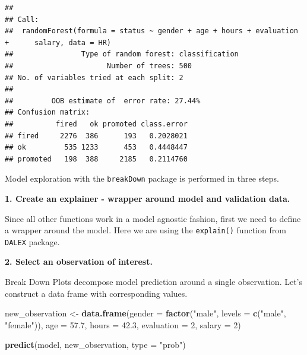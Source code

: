 \documentclass[]{krantz}
\newenvironment{Shaded}{\begin{snugshade}}{\end{snugshade}}
\newcommand{\ControlFlowTok}[1]{\textcolor[rgb]{0.13,0.29,0.53}{\textbf{#1}}}
\newcommand{\DataTypeTok}[1]{\textcolor[rgb]{0.13,0.29,0.53}{#1}}
\newcommand{\DecValTok}[1]{\textcolor[rgb]{0.00,0.00,0.81}{#1}}
\newcommand{\FloatTok}[1]{\textcolor[rgb]{0.00,0.00,0.81}{#1}}
\newcommand{\KeywordTok}[1]{\textcolor[rgb]{0.13,0.29,0.53}{\textbf{#1}}}
\newcommand{\NormalTok}[1]{#1}
\newcommand{\OperatorTok}[1]{\textcolor[rgb]{0.81,0.36,0.00}{\textbf{#1}}}
\newcommand{\StringTok}[1]{\textcolor[rgb]{0.31,0.60,0.02}{#1}}
\theoremstyle{definition}
\theoremstyle{definition}
\theoremstyle{definition}
\theoremstyle{remark}
\begin{document}
\begin{verbatim}
## 
## Call:
##  randomForest(formula = status ~ gender + age + hours + evaluation +      salary, data = HR) 
##                Type of random forest: classification
##                      Number of trees: 500
## No. of variables tried at each split: 2
## 
##         OOB estimate of  error rate: 27.44%
## Confusion matrix:
##          fired   ok promoted class.error
## fired     2276  386      193   0.2028021
## ok         535 1233      453   0.4448447
## promoted   198  388     2185   0.2114760
\end{verbatim}

Model exploration with the \texttt{breakDown} package is performed in
three steps.

\textbf{1. Create an explainer - wrapper around model and validation
data.}

Since all other functions work in a model agnostic fashion, first we
need to define a wrapper around the model. Here we are using the
\texttt{explain()} function from \texttt{DALEX} package.

\begin{Shaded}
\end{Shaded}

\textbf{2. Select an observation of interest.}

Break Down Plots decompose model prediction around a single observation.
Let's construct a data frame with corresponding values.

\begin{Shaded}
\begin{Highlighting}[]
\NormalTok{new_observation <-}\StringTok{ }\KeywordTok{data.frame}\NormalTok{(}\DataTypeTok{gender =} \KeywordTok{factor}\NormalTok{(}\StringTok{"male"}\NormalTok{, }\DataTypeTok{levels =} \KeywordTok{c}\NormalTok{(}\StringTok{"male"}\NormalTok{, }\StringTok{"female"}\NormalTok{)),}
                      \DataTypeTok{age =} \FloatTok{57.7}\NormalTok{,}
                      \DataTypeTok{hours =} \FloatTok{42.3}\NormalTok{,}
                      \DataTypeTok{evaluation =} \DecValTok{2}\NormalTok{,}
                      \DataTypeTok{salary =} \DecValTok{2}\NormalTok{)}

\KeywordTok{predict}\NormalTok{(model, new_observation, }\DataTypeTok{type =} \StringTok{"prob"}\NormalTok{)}
\end{Highlighting}
\end{Shaded}
\end{document}
